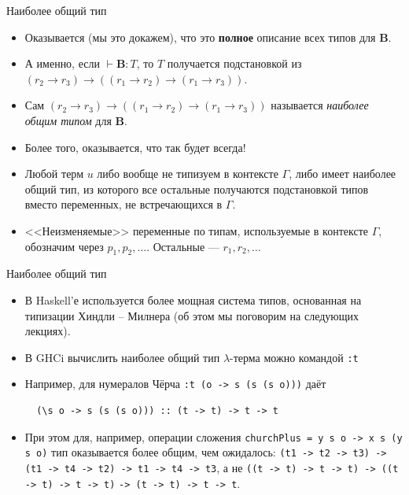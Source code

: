 \documentclass[xcolor=dvipsnames]{beamer}
\newcommand{\Bx}{\mathbf{B}}
\begin{document}
\begin{frame}{Наиболее общий тип}
 
 \begin{itemize}[<+->]
  \item Оказывается (мы это докажем), что это {\bf полное} описание всех типов для $\Bx$.
  \item А именно, если $\vdash \Bx : T$, то $T$ получается подстановкой из $(r_2 \to r_3) \to ((r_1 \to r_2) \to (r_1 \to r_3))$.
  \item Сам $(r_2 \to r_3) \to ((r_1 \to r_2) \to (r_1 \to r_3))$ называется {\em наиболее общим типом} для $\Bx$.
  \item Более того, оказывается, что так будет всегда!
  \item Любой терм $u$ либо вообще не типизуем в контексте $\Gamma$, либо имеет наиболее общий тип, из которого все остальные получаются подстановкой типов вместо переменных, не встречающихся в $\Gamma$.
  \item {<<Неизменяемые>>} переменные по типам, используемые в контексте $\Gamma$, обозначим через $p_1, p_2, \ldots$. Остальные --- $r_1, r_2, \ldots$
 \end{itemize}

\end{frame}

\begin{frame}[fragile]{Наиболее общий тип}

\begin{itemize}[<+->]
 \item В Haskell'е используется более мощная система типов, основанная на типизации Хиндли -- Милнера (об этом мы поговорим на следующих лекциях).
 \item В GHCi вычислить наиболее общий тип $\lambda$-терма можно командой {\tt :t}
 \item Например, для нумералов Чёрча \texttt{:t (\s o -> s (s (s o)))} даёт
 \begin{verbatim}
  (\s o -> s (s (s o))) :: (t -> t) -> t -> t
 \end{verbatim}

 \item При этом для, например, операции сложения
 \texttt{churchPlus = \x y s o -> x s (y s o)} тип оказывается более общим, чем ожидалось:
 \texttt{(t1 -> t2 -> t3) -> (t1 -> t4 -> t2) -> t1 -> t4 -> t3}, а не
 \texttt{((t -> t) -> t -> t) -> ((t -> t) -> t -> t)}
 \texttt{-> (t -> t) -> t -> t}.
\end{itemize}

 
\end{frame}
\end{document}
